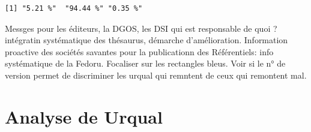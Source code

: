 \documentclass[]{article}
\begin{document}
\begin{verbatim}
[1] "5.21 %"  "94.44 %" "0.35 %" 
\end{verbatim}

Messges pour les éditeurs, la DGOS, les DSI qui est responsable de quoi
? intégratin systématique des thésaurus, démarche d'amélioration.
Information proactive des sociétés savantes pour la publicationn des
Référentiels: info systématique de la Fedoru. Focaliser sur les
rectangles bleus. Voir si le n° de version permet de discriminer les
urqual qui remntent de ceux qui remontent mal.

\section{Analyse de Urqual}\label{analyse-de-urqual}
\end{document}
